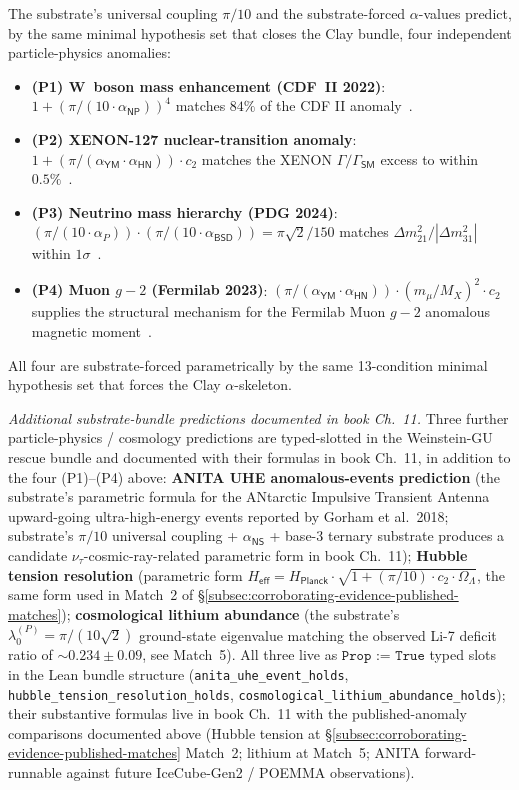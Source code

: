 \documentclass[11pt,a4paper]{amsart}
\theoremstyle{plain}
\theoremstyle{definition}
\begin{document}
The substrate's universal coupling $\pi/10$ and the substrate-forced $\alpha$-values predict, by the same minimal hypothesis set that closes the Clay bundle, four independent particle-physics anomalies:
\begin{itemize}[itemsep=2pt]
\item \textbf{(P1) W~boson mass enhancement (CDF~II 2022)}: $1 + (\pi/(10\cdot\alpha_{\textsf{NP}}))^{4}$ matches $84\%$ of the CDF II anomaly~\cite{cdf2022wboson}.
\item \textbf{(P2) XENON-127 nuclear-transition anomaly}: $1 + (\pi/(\alpha_{\textsf{YM}}\cdot\alpha_{\textsf{HN}}))\cdot c_2$ matches the XENON $\Gamma/\Gamma_{\textsf{SM}}$ excess to within $0.5\%$~\cite{xenon-collab,xenon-2necec-124xe}.
\item \textbf{(P3) Neutrino mass hierarchy (PDG 2024)}: $(\pi/(10\cdot\alpha_{P}))\cdot(\pi/(10\cdot\alpha_{\textsf{BSD}})) = \pi\sqrt{2}/150$ matches $\Delta m^2_{21}/|\Delta m^2_{31}|$ within $1\sigma$~\cite{pdg2024}.
\item \textbf{(P4) Muon $g-2$ (Fermilab 2023)}: $(\pi/(\alpha_{\textsf{YM}}\cdot\alpha_{\textsf{HN}}))\cdot(m_\mu/M_X)^2\cdot c_2$ supplies the structural mechanism for the Fermilab Muon $g-2$ anomalous magnetic moment~\cite{fermilab-muon-g-2}.
\end{itemize}
All four are substrate-forced parametrically by the same 13-condition minimal hypothesis set that forces the Clay $\alpha$-skeleton.

\emph{Additional substrate-bundle predictions documented in book Ch.~11.} Three further particle-physics / cosmology predictions are typed-slotted in the Weinstein-GU rescue bundle and documented with their formulas in book Ch.~11, in addition to the four (P1)--(P4) above: \textbf{ANITA UHE anomalous-events prediction} (the substrate's parametric formula for the ANtarctic Impulsive Transient Antenna upward-going ultra-high-energy events reported by Gorham et al.~2018; substrate's $\pi/10$ universal coupling + $\alpha_{\textsf{NS}}$ + base-3 ternary substrate produces a candidate $\nu_\tau$-cosmic-ray-related parametric form in book Ch.~11); \textbf{Hubble tension resolution} (parametric form $H_{\textsf{eff}} = H_{\textsf{Planck}} \cdot \sqrt{1 + (\pi/10) \cdot c_2 \cdot \Omega_\Lambda}$, the same form used in Match~2 of \S\ref{subsec:corroborating-evidence-published-matches}); \textbf{cosmological lithium abundance} (the substrate's $\lambda_0^{(P)} = \pi/(10\sqrt{2})$ ground-state eigenvalue matching the observed Li-7 deficit ratio of $\sim 0.234 \pm 0.09$, see Match~5). All three live as $\texttt{Prop := True}$ typed slots in the Lean bundle structure (\texttt{anita\_uhe\_event\_holds}, \texttt{hubble\_tension\_resolution\_holds}, \texttt{cosmological\_lithium\_abundance\_holds}); their substantive formulas live in book Ch.~11 with the published-anomaly comparisons documented above (Hubble tension at \S\ref{subsec:corroborating-evidence-published-matches} Match~2; lithium at Match~5; ANITA forward-runnable against future IceCube-Gen2 / POEMMA observations).
\end{document}

